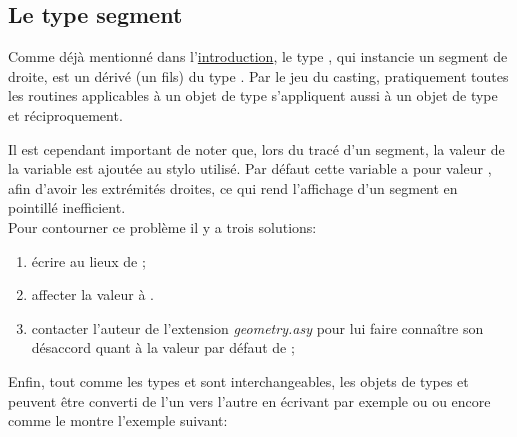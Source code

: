 \documentclass[pdftex]{article}
\newcommand{\geo}{l'extension \emph{geometry.asy}\xspace}
\begin{document}
\subsection{Le type \texorpdfstring{\og{}segment\fg{}}{segment}}
Comme déjà mentionné dans l'\href{#section.intro}{introduction}, le type , qui
instancie un segment de droite, est un dérivé (un fils) du type
. Par le jeu du \og{}casting\fg{}, pratiquement toutes
les routines applicables à un objet de type  s'appliquent
aussi à un objet de type  et réciproquement.

Il est cependant important de noter que, lors du tracé d'un segment, la
valeur de la variable  est ajoutée au stylo
utilisé. Par défaut cette variable a pour valeur ,
afin d'avoir les extrémités droites, ce qui rend l'affichage d'un
segment en pointillé inefficient.\\
Pour contourner ce problème il y a trois solutions:
\begin{enumerate}
\item écrire  au lieux de
  ;
\item affecter la valeur  à .
\item contacter l'auteur de \geo pour lui faire connaître
  son désaccord quant à la valeur par défaut de ;
\end{enumerate}

Enfin, tout comme les types  et  sont
interchangeables, les objets de types  et 
peuvent être converti de l'un vers l'autre en écrivant par exemple
\linebreak ou  ou
encore 
comme le montre l'exemple suivant:
\end{document}
